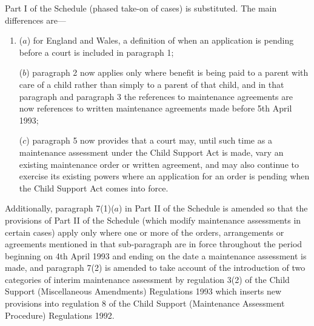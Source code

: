 \documentclass[a4paper]{article}
\begin{document}
 Part I of the Schedule (phased take-on of cases) is substituted. The main differences are—
\begin{enumerate}\item[]
 ($a$) for England and Wales, a definition of when an application is pending before a court is included in paragraph 1;

 ($b$) paragraph 2 now applies only where benefit is being paid to a parent with care of a child rather than simply to a parent of that child, and in that paragraph and paragraph 3 the references to maintenance agreements are now references to written maintenance agreements made before 5th April 1993;

 ($c$) paragraph 5 now provides that a court may, until such time as a maintenance assessment under the Child Support Act is made, vary an existing maintenance order or written agreement, and may also continue to exercise its existing powers where an application for an order is pending when the Child Support Act comes into force.
\end{enumerate}

  Additionally, paragraph 7(1)($a$) in Part II of the Schedule is amended so that the provisions of Part II of the Schedule (which modify maintenance assessments in certain cases) apply only where one or more of the orders, arrangements or agreements mentioned in that sub-paragraph are in force throughout the period beginning on 4th April 1993 and ending on the date a maintenance assessment is made, and paragraph 7(2) is amended to take account of the introduction of two categories of interim maintenance assessment by regulation 3(2) of the Child Support (Miscellaneous Amendments) Regulations 1993 which inserts new provisions into regulation 8 of the Child Support (Maintenance Assessment Procedure) Regulations 1992.
\end{document}
